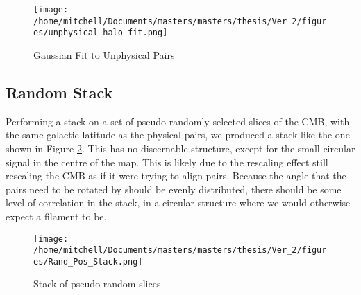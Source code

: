 \begin{figure}[H]
\centering
\texttt{[image: /home/mitchell/Documents/masters/masters/thesis/Ver\_2/figures/unphysical\_halo\_fit.png]}
\caption{Gaussian Fit to Unphysical Pairs}
\label{fig:unphysical:fit}
\end{figure}

\subsection{Random Stack}

Performing a stack on a set of pseudo-randomly selected slices of the CMB, with the same galactic latitude as the physical pairs, we produced a stack like the one shown in Figure \ref{fig:random:stack}. This has no discernable structure, except for the small circular signal in the centre of the map. This is likely due to the rescaling effect still rescaling the CMB as if it were trying to align pairs. Because the angle that the pairs need to be rotated by should be evenly distributed, there should be some level of correlation in the stack, in a circular structure where we would otherwise expect a filament to be. 

\begin{figure}[H]
\centering
\texttt{[image: /home/mitchell/Documents/masters/masters/thesis/Ver\_2/figures/Rand\_Pos\_Stack.png]}
\caption{Stack of pseudo-random slices}
\label{fig:random:stack}
\end{figure}

